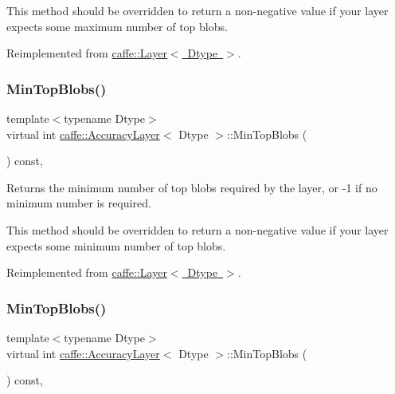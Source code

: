 This method should be overridden to return a non-\/negative value if your layer expects some maximum number of top blobs. 

Reimplemented from \mbox{\hyperlink{classcaffe_1_1_layer_ac6c03df0b6e40e776c94001e19994a2e}{caffe\+::\+Layer$<$ Dtype $>$}}.

\mbox{\label{classcaffe_1_1_accuracy_layer_a568dd59acff7a172fa614c88ac56aff7}} 
\subsubsection{\texorpdfstring{Min\+Top\+Blobs()}{MinTopBlobs()}\hspace{0.1cm}{\footnotesize\ttfamily [1/2]}}
{\footnotesize\ttfamily template$<$typename Dtype$>$ \\
virtual int \mbox{\hyperlink{classcaffe_1_1_accuracy_layer}{caffe\+::\+Accuracy\+Layer}}$<$ Dtype $>$\+::Min\+Top\+Blobs (\begin{DoxyParamCaption}{ }\end{DoxyParamCaption}) const\hspace{0.3cm}{\ttfamily [inline]}, {\ttfamily [virtual]}}



Returns the minimum number of top blobs required by the layer, or -\/1 if no minimum number is required. 

This method should be overridden to return a non-\/negative value if your layer expects some minimum number of top blobs. 

Reimplemented from \mbox{\hyperlink{classcaffe_1_1_layer_ab9e4c8d642e413948b131d851a8462a4}{caffe\+::\+Layer$<$ Dtype $>$}}.

\mbox{\label{classcaffe_1_1_accuracy_layer_a568dd59acff7a172fa614c88ac56aff7}} 
\subsubsection{\texorpdfstring{Min\+Top\+Blobs()}{MinTopBlobs()}\hspace{0.1cm}{\footnotesize\ttfamily [2/2]}}
{\footnotesize\ttfamily template$<$typename Dtype$>$ \\
virtual int \mbox{\hyperlink{classcaffe_1_1_accuracy_layer}{caffe\+::\+Accuracy\+Layer}}$<$ Dtype $>$\+::Min\+Top\+Blobs (\begin{DoxyParamCaption}{ }\end{DoxyParamCaption}) const\hspace{0.3cm}{\ttfamily [inline]}, {\ttfamily [virtual]}}



